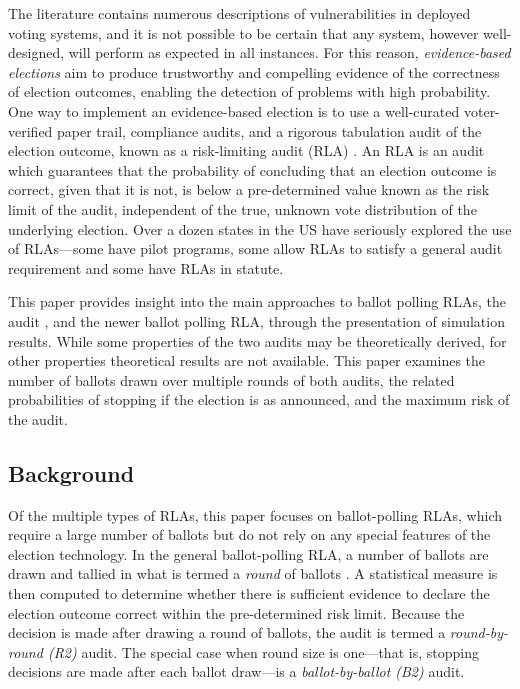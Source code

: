 The literature contains numerous descriptions of vulnerabilities in deployed voting systems, and it is not possible to be certain that any system, however well-designed, will perform as expected in all instances. For this reason, 
{\em evidence-based elections} \cite{evidence-based} aim to produce trustworthy and compelling evidence of the correctness of election outcomes, enabling the detection of problems with high probability. One way to implement an evidence-based election is to use a well-curated voter-verified paper trail, compliance audits, and a rigorous tabulation audit of the election outcome, known as a risk-limiting audit (RLA) \cite{RLA}. An RLA is an audit which guarantees that the probability of concluding that an election outcome is correct, given that it is not, is below a pre-determined value known as the risk limit of the audit, independent of the true, unknown vote distribution of the underlying election. Over a dozen states in the US have seriously explored the use of RLAs---some have pilot programs, some allow RLAs to satisfy a general audit requirement and some have RLAs in statute.     

This paper provides insight into the main approaches to ballot polling RLAs, the \BRAVO audit \cite{bravo}, and the newer \Minerva \cite{usenix_minerva} ballot polling RLA, through the presentation of simulation results. While some properties of the two audits may be theoretically derived, for other properties theoretical results are not available. This paper examines the number of ballots drawn over multiple rounds of both audits, the related probabilities of stopping if the election is as announced, and the maximum risk of the audit. 

\subsection{Background}
Of the multiple types of RLAs, this paper focuses on ballot-polling RLAs, which require a large number of ballots but do not rely on any special features of the election technology. In the general ballot-polling RLA, a number of ballots are drawn and tallied in what is termed a {\em round} of ballots \cite{usenix_minerva}. A statistical measure is then computed to determine whether there is sufficient evidence to declare the election outcome correct within the pre-determined risk limit. Because the decision is made after drawing a round of ballots, the audit is termed a {\em round-by-round (R2)} audit. The special case when round size is one---that is, stopping decisions are made after each ballot draw---is a {\em ballot-by-ballot (B2)} audit.

